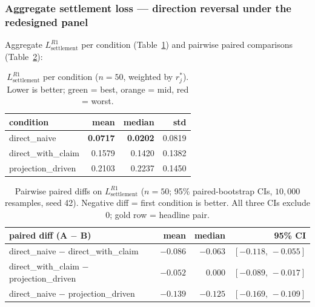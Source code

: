 \subsubsection{Aggregate settlement loss --- direction reversal under the redesigned panel}
\label{sec:results:exp2:aggregate}

Aggregate $L_{\text{settlement}}^{R1}$ per condition (Table~\ref{tab:exp2_aggregate}) and pairwise paired comparisons (Table~\ref{tab:exp2_paired}):

\begin{table}[t]
\centering
\caption{$L_{\text{settlement}}^{R1}$ per condition ($n = 50$, weighted by $r^*_j$). Lower is better; green = best, orange = mid, red = worst.}
\label{tab:exp2_aggregate}
\begin{tabular}{lrrr}
\toprule
\textbf{condition} & \textbf{mean} & \textbf{median} & \textbf{std} \\
\midrule
direct\_naive       & \cellcolor{HMGood}\textbf{0.0717} & \cellcolor{HMGood}\textbf{0.0202} & \cellcolor{HMBackground}0.0819 \\
direct\_with\_claim & \cellcolor{HMMid}0.1579          & \cellcolor{HMMid}0.1420          & \cellcolor{HMBackground}0.1382 \\
projection\_driven  & \cellcolor{HMHigh}0.2103          & \cellcolor{HMHigh}0.2237          & \cellcolor{HMBackground}0.1450 \\
\bottomrule
\end{tabular}
\end{table}

\begin{table}[!t]
\centering
\caption{Pairwise paired diffs on $L_{\text{settlement}}^{R1}$ ($n = 50$; 95\% paired-bootstrap CIs, $10{,}000$ resamples, seed 42). Negative diff = first condition is better. All three CIs exclude $0$; gold row = headline pair.}
\label{tab:exp2_paired}
\begin{tabular}{lrrr}
\toprule
\textbf{paired diff (A $-$ B)} & \textbf{mean} & \textbf{median} & \textbf{95\% CI} \\
\midrule
direct\_naive $-$ direct\_with\_claim     & $-0.086$ & $-0.063$ & $[-0.118,\, -0.055]$ \\
direct\_with\_claim $-$ projection\_driven & $-0.052$ & $\phantom{-}0.000$ & $[-0.089,\, -0.017]$ \\
\rowcolor{HMHeadline}
direct\_naive $-$ projection\_driven      & $\mathbf{-0.139}$ & $\mathbf{-0.125}$ & $\mathbf{[-0.169,\, -0.109]}$ \\
\bottomrule
\end{tabular}
\end{table}


